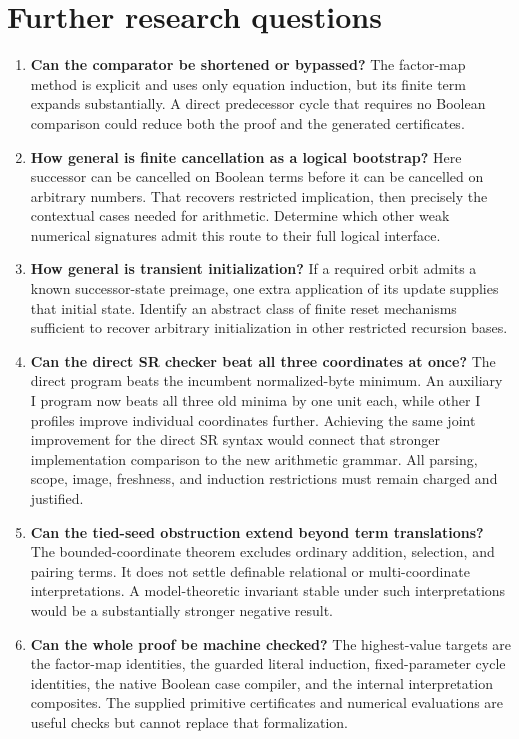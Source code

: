 \section{Further research questions}

\begin{enumerate}
\item \textbf{Can the comparator be shortened or bypassed?} The factor-map
method is explicit and uses only equation induction, but its finite term
expands substantially. A direct predecessor cycle that requires no Boolean
comparison could reduce both the proof and the generated certificates.

\item \textbf{How general is finite cancellation as a logical bootstrap?}
Here successor can be cancelled on Boolean terms before it can be cancelled
on arbitrary numbers. That recovers restricted implication, then precisely
the contextual cases needed for arithmetic. Determine which other weak
numerical signatures admit this route to their full logical interface.

\item \textbf{How general is transient initialization?} If a required orbit
admits a known successor-state preimage, one extra application of its
update supplies that initial state. Identify an abstract class of finite
reset mechanisms sufficient to recover arbitrary initialization in other
restricted recursion bases.

\item \textbf{Can the direct SR checker beat all three coordinates at once?}
The direct program beats the incumbent normalized-byte minimum. An
auxiliary I program now beats all three old minima by one unit each, while
other I profiles improve individual coordinates further. Achieving the
same joint improvement for the direct SR syntax would connect that
stronger implementation comparison to the new arithmetic grammar.
All parsing, scope, image, freshness, and induction restrictions must remain
charged and justified.

\item \textbf{Can the tied-seed obstruction extend beyond term translations?}
The bounded-coordinate theorem excludes ordinary addition, selection,
and pairing terms. It does not settle definable relational or multi-coordinate
interpretations. A model-theoretic invariant stable under such interpretations
would be a substantially stronger negative result.

\item \textbf{Can the whole proof be machine checked?} The highest-value
targets are the factor-map identities, the guarded literal induction,
fixed-parameter cycle identities, the native Boolean case compiler,
and the internal interpretation composites. The supplied primitive
certificates and numerical evaluations are useful checks but cannot replace
that formalization.


\end{enumerate}
